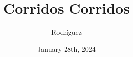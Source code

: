 \documentclass{article}
\title{Corridos Corridos}
\date{January 28th, 2024}
\author{Rodr\'iguez}
\begin{document}
\maketitle{}
\tableofcontents

\renewcommand\guitarPreAccord{\color{amaranth}\footnotesize\strut\bfseries}

%















\end{document}
